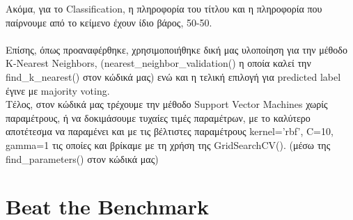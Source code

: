 \documentclass{article}
\begin{document}
Ακόμα, για το \textlatin{Classification}, η πληροφορία του τίτλου και η πληροφορία που παίρνουμε από το κείμενο
έχουν ίδιο βάρος, 50-50.\\\\

Επίσης, όπως προαναφέρθηκε, χρησιμοποιήθηκε δική μας υλοποίηση για την μέθοδο \textlatin{K-Nearest Neighbors},
\textlatin{(nearest\_neighbor\_validation()} η οποία καλεί την\\ \textlatin{find\_k\_nearest()} στον κώδικά μας)
ενώ και η τελική επιλογή για \textlatin{predicted label} έγινε με \textlatin{majority voting}.\\

Τέλος, στον κώδικά μας τρέχουμε την μέθοδο \textlatin{Support Vector Machines} χωρίς παραμέτρους, ή να δοκιμάσουμε
τυχαίες τιμές παραμέτρων, με το καλύτερο αποτέτεσμα να παραμένει 
και με τις βέλτιστες παραμέτρους \textlatin{kernel='rbf', C=10, gamma=1} τις οποίες και βρίκαμε με τη χρήση
της \textlatin{GridSearchCV()}. (μέσω της \textlatin{find\_parameters()} στον κώδικά μας) 


\section{\textlatin{Beat the Benchmark}}
\end{document}
